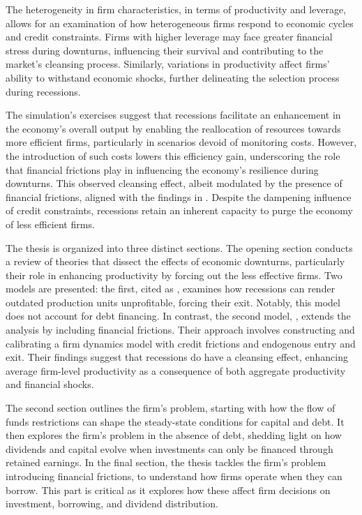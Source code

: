 \documentclass[12pt]{report}
\begin{document}
The heterogeneity in firm characteristics, in terms of productivity and leverage, allows for an
examination of how heterogeneous firms respond to economic cycles and credit constraints. Firms with higher leverage may face
greater financial stress during downturns, influencing their survival and contributing to the market's cleansing
process. Similarly, variations in productivity affect firms' ability to withstand economic shocks, further delineating
the selection process during recessions. 

The simulation's exercises suggest that recessions facilitate an enhancement in the economy's overall output by enabling
the reallocation of resources towards more efficient firms, particularly in scenarios devoid of monitoring costs.
However, the introduction of such costs lowers this efficiency gain, underscoring the role that financial
frictions play in influencing the economy's resilience during downturns. This observed cleansing effect, albeit
modulated by the presence of financial frictions, aligned with the findings in \cite{OsePap17}. Despite the dampening
influence of credit constraints, recessions retain an inherent capacity to purge the economy of 
less efficient firms.

The thesis is organized into three distinct sections. The opening section conducts a review of theories that dissect the
effects of economic downturns, particularly their role in enhancing productivity by forcing out the
less effective firms. Two models are presented: the first, cited as \cite{CabHarm94}, examines how recessions can render
outdated production units unprofitable, forcing their exit. Notably, this model does not account for
debt financing.  In contrast, the second model, \cite{OsePap17}, extends the analysis by including
financial frictions. Their approach involves constructing and calibrating a firm dynamics model with credit frictions
and endogenous entry and exit. Their findings suggest that recessions do have a cleansing effect, enhancing average
firm-level productivity as a consequence of both aggregate productivity and financial shocks.

The second section outlines the firm's problem, starting with how the flow of funds restrictions can shape the
 steady-state conditions for capital and debt. It then explores the firm's problem in the absence of debt,
shedding light on how dividends and capital evolve when investments can only be financed through retained earnings. 
In the final section, the thesis tackles the firm's problem introducing financial frictions, to understand how firms
operate when they can borrow. This part is critical as it explores how these affect firm decisions on
investment, borrowing, and dividend distribution. 
\end{document}
